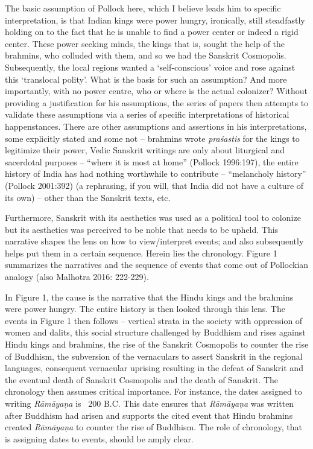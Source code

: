 The basic assumption of Pollock here, which I believe leads him to specific interpretation, is that Indian kings were power hungry, ironically, still steadfastly holding on to the fact that he is unable to find a power center or indeed a rigid center. These power seeking minds, the kings that is, sought the help of the brahmins, who colluded with them, and so we had the Sanskrit Cosmopolis. Subsequently, the local regions wanted a ‘self-conscious’ voice and rose against this ‘translocal polity’. What is the basis for such an assumption? And more importantly, with no power centre, who or where is the actual colonizer? Without providing a justification for his assumptions, the series of papers then attempts to validate these assumptions via a series of specific interpretations of historical happenstances. There are other assumptions and assertions in his interpretations, some explicitly stated and some not – brahmins wrote \textit{praśastis} for the kings to legitimize their power, Vedic Sanskrit writings are only about liturgical and sacerdotal purposes – “where it is most at home” (Pollock 1996:197), the entire history of India has had nothing worthwhile to contribute – “melancholy history” (Pollock 2001:392) (a rephrasing, if you will, that India did not have a culture of its own) – other than the Sanskrit texts, etc.

Furthermore, Sanskrit with its aesthetics was used as a political tool to colonize but its aesthetics was perceived to be noble that needs to be upheld. This narrative shapes the lens on how to view/interpret events; and also subsequently helps put them in a certain sequence. Herein lies the chronology. Figure 1 summarizes the narratives and the sequence of events that come out of Pollockian analogy (also Malhotra 2016: 222-229).

In Figure 1, the cause is the narrative that the Hindu kings and the brahmins were power hungry. The entire history is then looked through this lens. The events in Figure 1 then follows – vertical strata in the society with oppression of women and dalits, this social structure challenged by Buddhism and rises against Hindu kings and brahmins, the rise of the Sanskrit Cosmopolis to counter the rise of Buddhism, the subversion of the vernaculars to assert Sanskrit in the regional languages, consequent vernacular uprising resulting in the defeat of Sanskrit and the eventual death of Sanskrit Cosmopolis and the death of Sanskrit. The chronology then assumes critical importance. For instance, the dates assigned to writing \textit{Rāmāyaṇa} is ~200 B.C. This date ensures that \textit{Rāmāyaṇa} was written after Buddhism had arisen and supports the cited event that Hindu brahmins created \textit{Rāmāyaṇa} to counter the rise of Buddhism. The role of chronology, that is assigning dates to events, should be amply clear.


